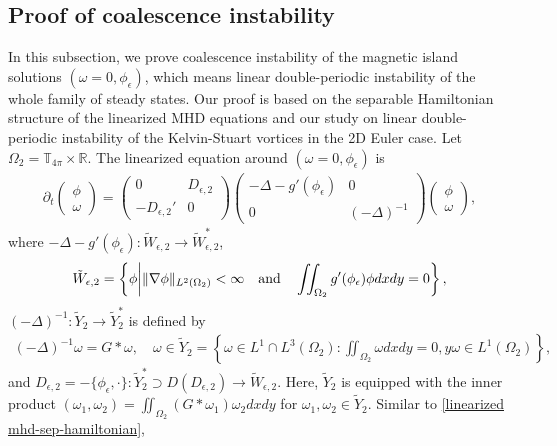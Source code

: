\documentclass[1 [leqno, 11pt]{amsart}
\numberwithin{equation}{section}
\let\ep=\epsilon
\begin{document}
\begin{CJK*}{GBK}{song}
\subsection{Proof of coalescence instability}
In this subsection, we prove  coalescence instability  of the  magnetic island solutions $(\omega=0,\phi_{\ep})$, which means
 linear double-periodic instability of the whole family of steady states. Our proof  is based on the separable Hamiltonian structure of the linearized MHD equations and our study on linear double-periodic instability of the Kelvin-Stuart vortices  in the 2D Euler case.
Let $\Omega_2 = \mathbb{T}_{4\pi} \times \mathbb{R}$.
The linearized equation around $(\omega=0,\phi_{\ep})$ is
\begin{align}\label{linearized mhd-sep-hamiltonian-2}
\partial_t \left( \begin{array}{c} \phi \\ \omega \end{array} \right) = \left( \begin{array}{cc} 0 & D_{\ep,2} \\ -D_{\ep,2}' & 0 \end{array} \right)\left( \begin{array}{cc}-\Delta-g'(\phi_{\ep}) & 0 \\ 0 & (-\Delta)^{-1} \end{array} \right) \left( \begin{array}{c} \phi \\ \omega \end{array} \right),
\end{align}
where  $-\Delta-g'(\phi_{\ep}):\tilde W_{\ep,2}\to\tilde W_{\ep,2}^*$,
\begin{align*}
\tilde W_{\ep,2}=\left\{ \phi \bigg| \|\nabla \phi\|_{L^2(\Omega_2)} < \infty\quad {\rm{ and }}\quad\iint_{\Omega_2} g'(\phi_\ep)\phi dxdy=0 \right\},
\end{align*}
$(-\Delta)^{-1}:\tilde Y_2\to\tilde Y_2^*$ is defined by
\begin{align*}(-\Delta)^{-1}\omega=G\ast\omega,\quad\omega\in \tilde Y_2=\left\{\omega\in L^1\cap L^3 (\Omega_2):\iint_{\Omega_2}\omega dxdy=0,y\omega\in L^1(\Omega_2)\right\},
\end{align*}
and $D_{\ep,2}=-\{\phi_{\ep},\cdot\}:\tilde Y_2^*\supset D(D_{\ep,2})\to\tilde W_{\ep,2}$. Here, $\tilde Y_2$ is equipped with the inner product $(\omega_1, \omega_2) = \iint_{\Omega_2}(G\ast\omega_1)\omega_2 dxdy$ for $\omega_1, \omega_2 \in \tilde Y_2$. Similar to \eqref{linearized mhd-sep-hamiltonian},

\end{CJK*}
\end{document}
